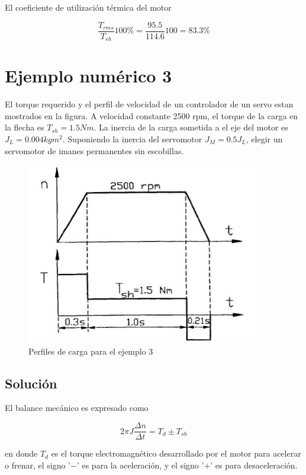 \documentclass[12pt]{book}
\theoremstyle{definition}
\theoremstyle{remark}
\theoremstyle{plain}
\begin{document}
El coeficiente de utilización térmica del motor

\begin{equation*}
\frac{T_{rms}}{T_{sh}}100 \% = \frac{95.5}{114.6}100=83.3 \%
\end{equation*}

\section{Ejemplo numérico 3}

El torque requerido y el perfil de velocidad de un controlador de un servo estan mostrados en la figura. A velocidad constante 2500 rpm, el torque de la carga en la flecha es $T_{sh} = 1.5 Nm$. La inercia de la carga sometida a el eje del motor es $J_L = 0.004 kgm^2$. Suponiendo la inercia del servomotor $J_M = 0.5 J_L$, elegir un servomotor de imanes permanentes sin escobillas.

\begin{figure}
\centering
\includegraphics[width=4in]{perfilcarga.jpg}
\caption{Perfiles de carga para el ejemplo 3}
\label{fig4}
\end{figure}

\subsection{Solución}

El balance mecánico es expresado como


\begin{equation*}
2 \pi J \frac{\Delta n}{\Delta t} = T_d \pm T_{sh}
\end{equation*}

en donde $T_d$ es el torque electromagnético desarrollado por el motor para acelerar o frenar, el signo '$-$' es para la aceleración, y el signo '$+$' es para desaceleración.
\end{document}
